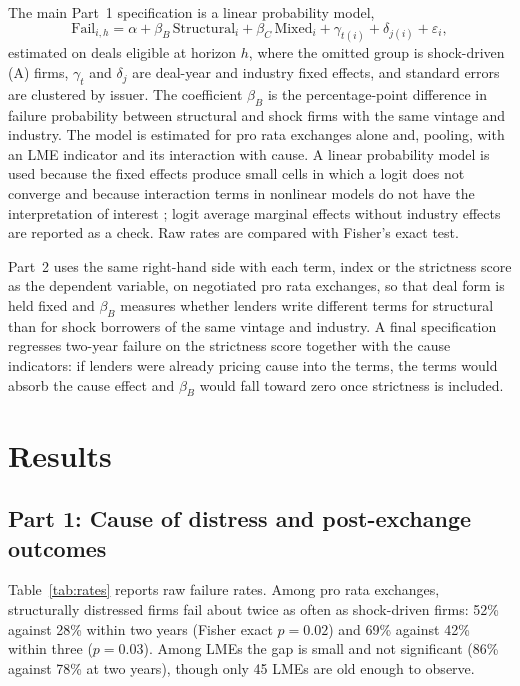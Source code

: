 \documentclass[12pt]{article}
\begin{document}
The main Part~1 specification is a linear probability model,
\begin{equation}
  \text{Fail}_{i,h} = \alpha + \beta_B\,\text{Structural}_i + \beta_C\,\text{Mixed}_i + \gamma_{t(i)} + \delta_{j(i)} + \varepsilon_i ,
  \label{eq:main}
\end{equation}
estimated on deals eligible at horizon $h$, where the omitted group is shock-driven (A) firms, $\gamma_t$ and $\delta_j$ are deal-year and industry fixed effects, and standard errors are clustered by issuer. The coefficient $\beta_B$ is the percentage-point difference in failure probability between structural and shock firms with the same vintage and industry. The model is estimated for pro rata exchanges alone and, pooling, with an LME indicator and its interaction with cause. A linear probability model is used because the fixed effects produce small cells in which a logit does not converge and because interaction terms in nonlinear models do not have the interpretation of interest \citep{aiNorton2003}; logit average marginal effects without industry effects are reported as a check. Raw rates are compared with Fisher's exact test.

Part~2 uses the same right-hand side with each term, index or the strictness score as the dependent variable, on negotiated pro rata exchanges, so that deal form is held fixed and $\beta_B$ measures whether lenders write different terms for structural than for shock borrowers of the same vintage and industry. A final specification regresses two-year failure on the strictness score together with the cause indicators: if lenders were already pricing cause into the terms, the terms would absorb the cause effect and $\beta_B$ would fall toward zero once strictness is included.

\section{Results}

\subsection{Part 1: Cause of distress and post-exchange outcomes}
\label{sec:p1}

Table~\ref{tab:rates} reports raw failure rates. Among pro rata exchanges, structurally distressed firms fail about twice as often as shock-driven firms: 52\% against 28\% within two years (Fisher exact $p = 0.02$) and 69\% against 42\% within three ($p = 0.03$). Among LMEs the gap is small and not significant (86\% against 78\% at two years), though only 45 LMEs are old enough to observe.
\end{document}
